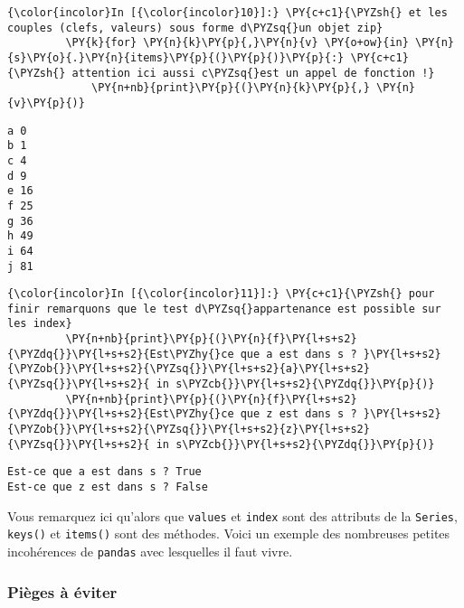     \begin{Verbatim}[commandchars=\\\{\}]
{\color{incolor}In [{\color{incolor}10}]:} \PY{c+c1}{\PYZsh{} et les couples (clefs, valeurs) sous forme d\PYZsq{}un objet zip}
         \PY{k}{for} \PY{n}{k}\PY{p}{,}\PY{n}{v} \PY{o+ow}{in} \PY{n}{s}\PY{o}{.}\PY{n}{items}\PY{p}{(}\PY{p}{)}\PY{p}{:} \PY{c+c1}{\PYZsh{} attention ici aussi c\PYZsq{}est un appel de fonction !}
             \PY{n+nb}{print}\PY{p}{(}\PY{n}{k}\PY{p}{,} \PY{n}{v}\PY{p}{)}
\end{Verbatim}


    \begin{Verbatim}[commandchars=\\\{\}]
a 0
b 1
c 4
d 9
e 16
f 25
g 36
h 49
i 64
j 81

    \end{Verbatim}

    \begin{Verbatim}[commandchars=\\\{\}]
{\color{incolor}In [{\color{incolor}11}]:} \PY{c+c1}{\PYZsh{} pour finir remarquons que le test d\PYZsq{}appartenance est possible sur les index}
         \PY{n+nb}{print}\PY{p}{(}\PY{n}{f}\PY{l+s+s2}{\PYZdq{}}\PY{l+s+s2}{Est\PYZhy{}ce que a est dans s ? }\PY{l+s+s2}{\PYZob{}}\PY{l+s+s2}{\PYZsq{}}\PY{l+s+s2}{a}\PY{l+s+s2}{\PYZsq{}}\PY{l+s+s2}{ in s\PYZcb{}}\PY{l+s+s2}{\PYZdq{}}\PY{p}{)}
         \PY{n+nb}{print}\PY{p}{(}\PY{n}{f}\PY{l+s+s2}{\PYZdq{}}\PY{l+s+s2}{Est\PYZhy{}ce que z est dans s ? }\PY{l+s+s2}{\PYZob{}}\PY{l+s+s2}{\PYZsq{}}\PY{l+s+s2}{z}\PY{l+s+s2}{\PYZsq{}}\PY{l+s+s2}{ in s\PYZcb{}}\PY{l+s+s2}{\PYZdq{}}\PY{p}{)}
\end{Verbatim}


    \begin{Verbatim}[commandchars=\\\{\}]
Est-ce que a est dans s ? True
Est-ce que z est dans s ? False

    \end{Verbatim}

    Vous remarquez ici qu'alors que \texttt{values} et \texttt{index} sont
des attributs de la \texttt{Series}, \texttt{keys()} et \texttt{items()}
sont des méthodes. Voici un exemple des nombreuses petites incohérences
de \texttt{pandas} avec lesquelles il faut vivre.

    \hypertarget{piuxe8ges-uxe0-uxe9viter}{%
\subsubsection{Pièges à éviter}\label{piuxe8ges-uxe0-uxe9viter}}


